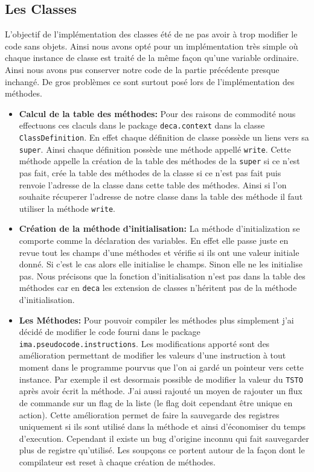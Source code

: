 \documentclass{article}
\begin{document}
\subsection{Les Classes}
L'objectif de l'implémentation des classes été de ne pas avoir à trop modifier le code sans objets. Ainsi nous avons opté pour un implémentation très simple où chaque instance de classe est traité de la même façon qu'une variable ordinaire. Ainsi nous avons pus conserver notre code de la partie précédente presque inchangé. De gros problèmes ce sont surtout posé lors de l'implémentation des méthodes. 
\begin{itemize}
\item \textbf{Calcul de la table des méthodes:}
\newline
Pour des raisons de commodité nous effectuons ces claculs dans le package \texttt{deca.context} dans la classe \texttt{ClassDefinition}. En effet chaque définition de classe possède un liens vers sa \texttt{super}.  Ainsi chaque définition
possède une méthode appellé \texttt{write}. Cette méthode appelle la création de la table des méthodes de la \texttt{super} si ce n'est pas fait, crée la table des méthodes de la classe si ce n'est pas fait puis renvoie l'adresse de la classe dans cette table des méthodes. Ainsi si l'on souhaite récuperer l'adresse de notre classe dans la table des méthode il faut utiliser la méthode \texttt{write}. 
\item \textbf{Création de la méthode d'initialisation:}
\newline 
La méthode d'initialization se comporte comme la déclaration des variables. En effet elle passe juste en revue tout les champs d'une méthodes et vérifie si ils ont une valeur initiale donné. Si c'est le cas alors elle initialise le champs. Sinon elle ne les initialise pas. Nous précisons que la fonction d'initialisation n'est pas dans la table des méthodes car en \texttt{deca} les extension de classes n'héritent pas de la méthode d'initialisation. 
\item \textbf{Les Méthodes:}
\newline
Pour pouvoir compiler les méthodes plus simplement j'ai décidé de modifier le code fourni dans le package \texttt{ima.pseudocode.instructions}. Les modifications apporté sont des amélioration permettant de modifier les valeurs d'une instruction à tout moment dans le programme pourvus que l'on ai gardé un pointeur vers cette instance. Par exemple il est desormais possible de modifier la valeur du \texttt{TSTO} après avoir écrit la méthode. J'ai aussi rajouté un moyen de rajouter un flux de commande sur un flag de la liste (le flag doit cependant être unique en action). Cette amélioration permet de faire la sauvegarde des registres uniquement si ils sont utilisé dans la méthode et ainsi d'économiser du temps d'execution. Cependant il existe un bug d'origine inconnu qui fait sauvegarder plus de registre qu'utilisé. Les soupçons ce portent autour de la façon dont le compilateur est reset à chaque création de méthodes. 

\end{itemize}
\end{document}
